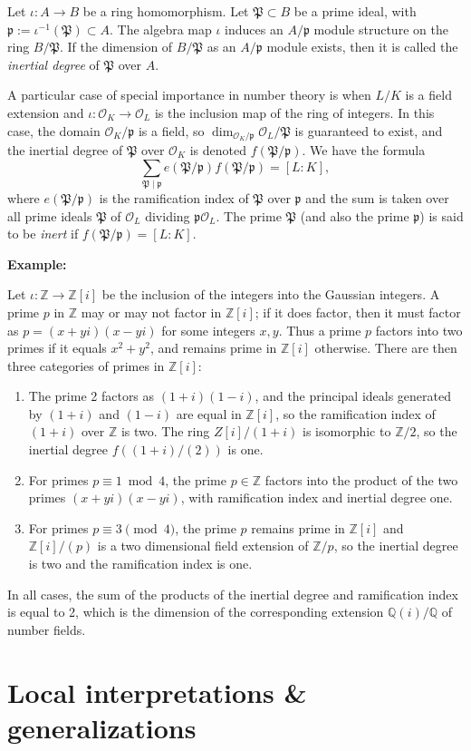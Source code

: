 \documentclass[12pt]{article}
\newcommand{\p}{\mathfrak{p}}
\renewcommand{\P}{\mathfrak{P}}
\renewcommand{\O}{\mathcal{O}}
\newcommand{\Z}{\mathbb{Z}}
\newcommand{\Q}{\mathbb{Q}}
\begin{document}
Let $\iota\colon A \to B$ be a ring homomorphism. Let $\P \subset B$ be a prime ideal, with $\p := \iota^{-1}(\P) \subset A$. The algebra map $\iota$ induces an $A/\p$ module structure on the ring $B/\P$. If the dimension of $B/\P$ as an $A/\p$ module exists, then it is called the \emph{inertial degree} of $\P$ over $A$.

A particular case of special importance in number theory is when $L/K$ is a field extension and $\iota\colon \O_K \to \O_L$ is the inclusion map of the ring of integers. In this case, the domain $\O_K/\p$ is a field, so $\dim_{\O_K/\p}\O_L/\P$ is guaranteed to exist, and the inertial degree of $\P$ over $\O_K$ is denoted $f(\P/\p)$. We have the formula
$$
\sum_{\P \mid \p} e(\P/\p) f(\P/\p) = [L:K],
$$
where $e(\P/\p)$ is the ramification index of $\P$ over $\p$ and the sum is taken over all prime ideals $\P$ of $\O_L$ dividing $\p\O_L$. The prime $\P$ (and also the prime $\p$) is said to be \emph{inert} if $f(\P/\p) = [L:K]$.

{\bf Example:}

Let $\iota\colon \Z \to \Z[i]$ be the inclusion of the integers into the Gaussian integers. A prime $p$ in $\Z$ may or may not factor in $\Z[i]$; if it does factor, then it must factor as $p = (x+yi)(x-yi)$ for some integers $x,y$. Thus a prime $p$ factors into two primes if it equals $x^2 + y^2$, and remains prime in $\Z[i]$ otherwise. There are then three categories of primes in $\Z[i]$:
\begin{enumerate}
\item The prime 2 factors as $(1+i)(1-i)$, and the principal ideals generated by $(1+i)$ and $(1-i)$ are equal in $\Z[i]$, so the ramification index of $(1+i)$ over $\Z$ is two. The ring $Z[i]/(1+i)$ is isomorphic to $\Z/2$, so the inertial degree $f((1+i)/(2))$ is one.
\item For primes $p \equiv 1 \bmod{4}$, the prime $p \in \Z$ factors into the product of the two primes $(x+yi)(x-yi)$, with ramification index and inertial degree one.
\item For primes $p \equiv 3 \pmod{4}$, the prime $p$ remains prime in $\Z[i]$ and $\Z[i]/(p)$ is a two dimensional field extension of $\Z/p$, so the inertial degree is two and the ramification index is one.
\end{enumerate}
In all cases, the sum of the products of the inertial degree and ramification index is equal to 2, which is the dimension of the corresponding extension $\Q(i)/\Q$ of number fields.

\section{Local interpretations \& generalizations}
\end{document}
